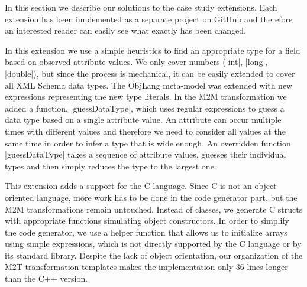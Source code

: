 
\label{sec:Extensions}


In this section we describe our solutions to the case study extensions.
Each extension has been implemented as a separate project on GitHub and therefore an interested reader can easily see what exactly has been changed.

\label{sec:Extension1}

In this extension we use a simple heuristics to find an appropriate type for a field based on observed attribute values.
We only cover numbers (\Scala|int|, \Scala|long|, \Scala|double|), but since the process is mechanical, it can be easily extended to cover all XML Schema data types.
%
The ObjLang meta-model was extended with new expressions representing the new type literals.
In the M2M transformation we added a function, \Scala|guessDataType|, which uses regular expressions to guess a data type based on a single attribute value.
An attribute can occur multiple times with different values and therefore we need to consider all values at the same time in order to infer a type that is wide enough.
An overridden function \Scala|guessDataType| takes a sequence of attribute values, guesses their individual types and then simply reduces the type to the largest one.

\label{sec:Extension2}

This extension adds a support for the C language.
Since C is not an object-oriented language, more work has to be done in the code generator part, but the M2M transformations remain untouched.
%
Instead of classes, we generate C structs with appropriate functions simulating object constructors.
In order to simplify the code generator, we use a helper function that allows us to initialize arrays using simple expressions, which is not directly supported by the C language or by its standard library.
%
Despite the lack of object orientation, our organization of the M2T transformation templates makes the implementation only 36 lines longer than the C++ version.

